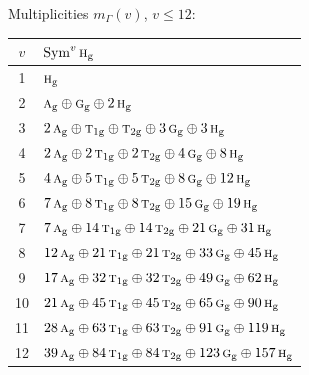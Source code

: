 \documentclass[11pt]{article}
\newcommand{\irr}[1]{\text{\normalfont\scshape #1}}
\newcommand{\ptag}[1]{\mathrm{#1}}
\begin{document}
Multiplicities $m_\Gamma(v)$, $v\le12$:
\begin{longtable}{c l}\hline $v$ & $\operatorname{Sym}^{v}\irr{h}_{\ptag{g}}$\\ \hline\endhead
1 & $\irr{h}_{\ptag{g}}$\\
2 & $\irr{a}_{\ptag{g}}\oplus \irr{g}_{\ptag{g}}\oplus 2\,\irr{h}_{\ptag{g}}$\\
3 & $2\,\irr{a}_{\ptag{g}}\oplus \irr{t}_{1\ptag{g}}\oplus \irr{t}_{2\ptag{g}}\oplus 3\,\irr{g}_{\ptag{g}}\oplus 3\,\irr{h}_{\ptag{g}}$\\
4 & $2\,\irr{a}_{\ptag{g}}\oplus 2\,\irr{t}_{1\ptag{g}}\oplus 2\,\irr{t}_{2\ptag{g}}\oplus 4\,\irr{g}_{\ptag{g}}\oplus 8\,\irr{h}_{\ptag{g}}$\\
5 & $4\,\irr{a}_{\ptag{g}}\oplus 5\,\irr{t}_{1\ptag{g}}\oplus 5\,\irr{t}_{2\ptag{g}}\oplus 8\,\irr{g}_{\ptag{g}}\oplus 12\,\irr{h}_{\ptag{g}}$\\
6 & $7\,\irr{a}_{\ptag{g}}\oplus 8\,\irr{t}_{1\ptag{g}}\oplus 8\,\irr{t}_{2\ptag{g}}\oplus 15\,\irr{g}_{\ptag{g}}\oplus 19\,\irr{h}_{\ptag{g}}$\\
7 & $7\,\irr{a}_{\ptag{g}}\oplus 14\,\irr{t}_{1\ptag{g}}\oplus 14\,\irr{t}_{2\ptag{g}}\oplus 21\,\irr{g}_{\ptag{g}}\oplus 31\,\irr{h}_{\ptag{g}}$\\
8 & $12\,\irr{a}_{\ptag{g}}\oplus 21\,\irr{t}_{1\ptag{g}}\oplus 21\,\irr{t}_{2\ptag{g}}\oplus 33\,\irr{g}_{\ptag{g}}\oplus 45\,\irr{h}_{\ptag{g}}$\\
9 & $17\,\irr{a}_{\ptag{g}}\oplus 32\,\irr{t}_{1\ptag{g}}\oplus 32\,\irr{t}_{2\ptag{g}}\oplus 49\,\irr{g}_{\ptag{g}}\oplus 62\,\irr{h}_{\ptag{g}}$\\
10 & $21\,\irr{a}_{\ptag{g}}\oplus 45\,\irr{t}_{1\ptag{g}}\oplus 45\,\irr{t}_{2\ptag{g}}\oplus 65\,\irr{g}_{\ptag{g}}\oplus 90\,\irr{h}_{\ptag{g}}$\\
11 & $28\,\irr{a}_{\ptag{g}}\oplus 63\,\irr{t}_{1\ptag{g}}\oplus 63\,\irr{t}_{2\ptag{g}}\oplus 91\,\irr{g}_{\ptag{g}}\oplus 119\,\irr{h}_{\ptag{g}}$\\
12 & $39\,\irr{a}_{\ptag{g}}\oplus 84\,\irr{t}_{1\ptag{g}}\oplus 84\,\irr{t}_{2\ptag{g}}\oplus 123\,\irr{g}_{\ptag{g}}\oplus 157\,\irr{h}_{\ptag{g}}$\\
\hline\end{longtable}
\end{document}
